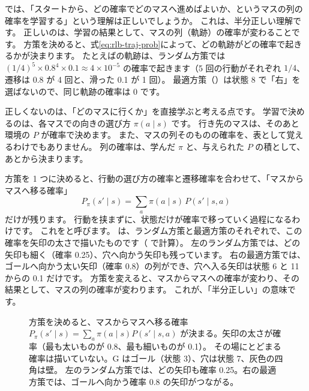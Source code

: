 では、「スタートから、どの確率でどのマスへ進めばよいか、というマスの列の確率を学習する」という理解は正しいでしょうか。
これは、半分正しい理解です。
正しいのは、学習の結果として、マスの列（軌跡）の確率が変わることです。
方策を決めると、式\eqref{eq:rlb-traj-prob}によって、どの軌跡がどの確率で起きるかが決まります。
たとえばの軌跡は、ランダム方策では $(1/4)^5\times0.8^4\times0.1\approx4\times10^{-5}$ の確率で起きます（5 回の行動がそれぞれ $1/4$、遷移は 0.8 が 4 回と、滑った 0.1 が 1 回）。
最適方策（）は状態 8 で「右」を選ばないので、同じ軌跡の確率は 0 です。

正しくないのは、「どのマスに行くか」を直接学ぶと考える点です。
学習で決めるのは、各マスでの向きの選び方 $\pi(a\mid s)$ です。
行き先のマスは、そのあと環境の $P$ が確率で決めます。
また、マスの列そのものの確率を、表として覚えるわけでもありません。
列の確率は、学んだ $\pi$ と、与えられた $P$ の積として、あとから決まります。

方策を 1 つに決めると、行動の選び方の確率と遷移確率を合わせて、「マスからマスへ移る確率」
\[
P_\pi(s'\mid s)=\sum_a\pi(a\mid s)\,P(s'\mid s,a)
\]
だけが残ります。
行動を挟まずに、状態だけが確率で移っていく過程になるわけです。
これをと呼びます。
は、ランダム方策と最適方策のそれぞれで、この確率を矢印の太さで描いたものです（ で計算）。
左のランダム方策では、どの矢印も細く（確率 0.25）、穴へ向かう矢印も残っています。
右の最適方策では、ゴールへ向かう太い矢印（確率 0.8）の列ができ、穴へ入る矢印は状態 6 と 11 からの 0.1 だけです。
方策を変えると、マスからマスへの確率が変わり、その結果として、マスの列の確率が変わります。
これが、「半分正しい」の意味です。

\begin{figure}[tbp]
\centering
{}
\caption{方策を決めると、マスからマスへ移る確率 $P_\pi(s'\mid s)=\sum_a\pi(a\mid s)P(s'\mid s,a)$ が決まる。矢印の太さが確率（最も太いものが 0.8、最も細いものが 0.1）。
その場にとどまる確率は描いていない。G はゴール（状態 3）、穴は状態 7、灰色の四角は壁。
左のランダム方策では、どの矢印も確率 0.25。右の最適方策では、ゴールへ向かう確率 0.8 の矢印がつながる。}
\label{fig:rlb-chain}
\end{figure}

